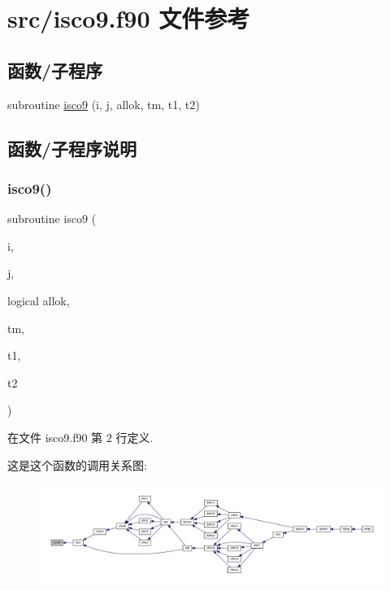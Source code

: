 \hypertarget{isco9_8f90}{}\section{src/isco9.f90 文件参考}
\label{isco9_8f90}
\subsection*{函数/子程序}
\begin{DoxyCompactItemize}
\item 
subroutine \mbox{\hyperlink{isco9_8f90_a6cbe5025ad81dba5f04b0448390fb63c}{isco9}} (i, j, allok, tm, t1, t2)
\end{DoxyCompactItemize}


\subsection{函数/子程序说明}
\mbox{\label{isco9_8f90_a6cbe5025ad81dba5f04b0448390fb63c}} 
\subsubsection{\texorpdfstring{isco9()}{isco9()}}
{\footnotesize\ttfamily subroutine isco9 (\begin{DoxyParamCaption}\item[{}]{i,  }\item[{}]{j,  }\item[{logical}]{allok,  }\item[{}]{tm,  }\item[{}]{t1,  }\item[{}]{t2 }\end{DoxyParamCaption})}



在文件 isco9.\+f90 第 2 行定义.

这是这个函数的调用关系图\+:
\nopagebreak
\begin{figure}[H]
\begin{center}
\leavevmode
\includegraphics[width=350pt]{isco9_8f90_a6cbe5025ad81dba5f04b0448390fb63c_icgraph}
\end{center}
\end{figure}

